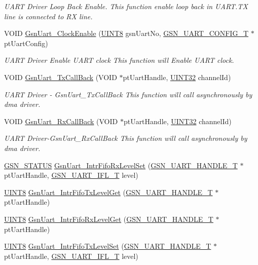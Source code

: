 \begin{DoxyCompactItemize}
\begin{DoxyCompactList}\small\item\em UART Driver Loop Back Enable. This function enable loop back in UART.TX line is connected to RX line. \end{DoxyCompactList}\item 
VOID \hyperlink{a00656_gaca9431f3944d584accd4697be926dde9}{GsnUart\_\-ClockEnable} (\hyperlink{a00660_gab27e9918b538ce9d8ca692479b375b6a}{UINT8} gsnUartNo, \hyperlink{a00268}{GSN\_\-UART\_\-CONFIG\_\-T} $\ast$ptUartConfig)
\begin{DoxyCompactList}\small\item\em UART Driver Enable UART clock This function will Enable UART clock. \end{DoxyCompactList}\item 
VOID \hyperlink{a00656_ga636fb7edc1ca9341330e1ff442e4c917}{GsnUart\_\-TxCallBack} (VOID $\ast$ptUartHandle, \hyperlink{a00660_gae1e6edbbc26d6fbc71a90190d0266018}{UINT32} channelId)
\begin{DoxyCompactList}\small\item\em UART Driver -\/ GsnUart\_\-TxCallBack This function will call asynchronously by dma driver. \end{DoxyCompactList}\item 
VOID \hyperlink{a00656_ga15a22d726c4fae9872826a00f83928eb}{GsnUart\_\-RxCallBack} (VOID $\ast$ptUartHandle, \hyperlink{a00660_gae1e6edbbc26d6fbc71a90190d0266018}{UINT32} channelId)
\begin{DoxyCompactList}\small\item\em UART Driver-\/GsnUart\_\-RxCallBack This function will call asynchronously by dma driver. \end{DoxyCompactList}\item 
\hyperlink{a00660_gada5951904ac6110b1fa95e51a9ddc217}{GSN\_\-STATUS} \hyperlink{a00600_a1b201c82db5f293b0926e528051fa07c}{GsnUart\_\-IntrFifoRxLevelSet} (\hyperlink{a00266}{GSN\_\-UART\_\-HANDLE\_\-T} $\ast$ptUartHandle, \hyperlink{a00656_ga170d0f1af6abfe39aa2dc0586412a85c}{GSN\_\-UART\_\-IFL\_\-T} level)
\item 
\hyperlink{a00660_gab27e9918b538ce9d8ca692479b375b6a}{UINT8} \hyperlink{a00600_a917e0f7cd57ee8857fbee1cd19a1c8da}{GsnUart\_\-IntrFifoTxLevelGet} (\hyperlink{a00266}{GSN\_\-UART\_\-HANDLE\_\-T} $\ast$ptUartHandle)
\item 
\hyperlink{a00660_gab27e9918b538ce9d8ca692479b375b6a}{UINT8} \hyperlink{a00600_a69e50b6d32f88ccdd5f1ab1a673b032e}{GsnUart\_\-IntrFifoRxLevelGet} (\hyperlink{a00266}{GSN\_\-UART\_\-HANDLE\_\-T} $\ast$ptUartHandle)
\item 
\hyperlink{a00660_gab27e9918b538ce9d8ca692479b375b6a}{UINT8} \hyperlink{a00600_adf9a2f1a6ab26f70e5df7f7b25c13919}{GsnUart\_\-IntrFifoTxLevelSet} (\hyperlink{a00266}{GSN\_\-UART\_\-HANDLE\_\-T} $\ast$ptUartHandle, \hyperlink{a00656_ga170d0f1af6abfe39aa2dc0586412a85c}{GSN\_\-UART\_\-IFL\_\-T} level)
\end{DoxyCompactItemize}


